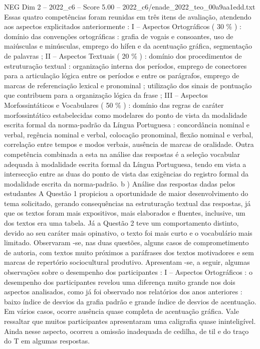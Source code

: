 \begin{textsample}{NEG Dim 2 – 2022\_c6 – Score 5.00 – 2022\_c6/enade\_2022\_teo\_00a9aa1edd.txt}
Essas quatro competências foram reunidas em três itens de avaliação, atendendo aos aspectos explicitados anteriormente : I – Aspectos Ortográficos ( 30 \% ) : domínio das convenções ortográficas : grafia de vogais e consoantes, uso de maiúsculas e minúsculas, emprego do hífen e da acentuação gráfica, segmentação de palavras ; II – Aspectos Textuais ( 20 \% ) : domínio dos procedimentos de estruturação textual : organização interna dos períodos, emprego de conectores para a articulação lógica entre os períodos e entre os parágrafos, emprego de marcas de referenciação lexical e pronominal ; utilização dos sinais de pontuação que contribuem para a organização lógica da frase ; III – Aspectos Morfossintáticos e Vocabulares ( 50 \% ) : domínio das regras de caráter morfossintático estabelecidas como modelares do ponto de vista da modalidade escrita formal da norma-padrão da Língua Portuguesa : concordância nominal e verbal, regência nominal e verbal, colocação pronominal, flexão nominal e verbal, correlação entre tempos e modos verbais, ausência de marcas de oralidade.
Outra competência combinada a esta na análise das respostas é a seleção vocabular adequada à modalidade escrita formal da Língua Portuguesa, tendo em vista a intersecção entre as duas do ponto de vista das exigências do registro formal da modalidade escrita da norma-padrão. b ) Análise das respostas dadas pelos estudantes A Questão 1 propiciou a oportunidade de maior desenvolvimento do tema solicitado, gerando consequências na estruturação textual das respostas, já que os textos foram mais expositivos, mais elaborados e fluentes, inclusive, um dos textos era uma tabela.
Já a Questão 2 teve um comportamento distinto, devido ao seu caráter mais opinativo, o texto foi mais curto e o vocabulário mais limitado.
Observaram -se, nas duas questões, alguns casos de comprometimento de autoria, com textos muito próximos a paráfrases dos textos motivadores e sem marcas de repertório sociocultural produtivo.
Apresentam -se, a seguir, algumas observações sobre o desempenho dos participantes : I – Aspectos Ortográficos : o desempenho dos participantes revelou uma diferença muito grande nos dois aspectos analisados, como já foi observado nos relatórios dos anos anteriores : baixo índice de desvios da grafia padrão e grande índice de desvios de acentuação.
Em vários casos, ocorre ausência quase completa de acentuação gráfica.
Vale ressaltar que muitos participantes apresentaram uma caligrafia quase ininteligível.
Ainda nesse aspecto, ocorreu a omissão inadequada de cedilha, de til e do traço do T em algumas respostas.

\end{textsample}

